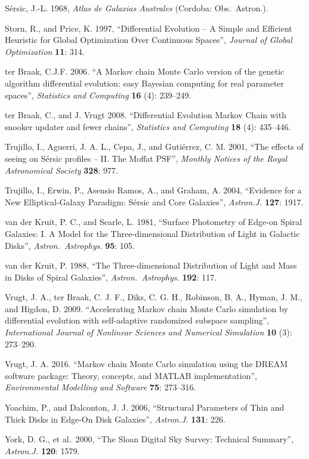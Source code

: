 \documentclass[10pt,a4paper,article]{memoir}
\begin{document}
\begin{thebibliography}{}
 S{\'e}rsic, J.-L. 1968, \textit{Atlas de 
Galaxias Australes} (Cordoba: Obs.\ Astron.).

 Storn, R., and Price, K. 1997, ``Differential
Evolution -- A Simple and Efficient Heuristic for Global Optimization Over
Continuous Spaces'', \textit{Journal of Global Optimization} \textbf{11}: 314.

 ter Braak, C.J.F. 2006.
``A Markov chain Monte Carlo version of the genetic
algorithm differential evolution: easy Bayesian computing for real
parameter spaces'', \textit{Statistics and Computing} \textbf{16} (4): 239--249.

 ter Braak, C., and J.
Vrugt 2008. ``Differential Evolution Markov Chain with snooker updater
and fewer chains'', \textit{Statistics and Computing} \textbf{18} (4): 435--446.

 Trujillo, I., Aguerri, J. A. L.,
Cepa, J., and Guti{\'e}rrez, C. M. 2001, ``The effects of seeing on S{\'e}rsic
profiles -- II. The Moffat PSF'', \textit{Monthly Notices of the Royal
Astronomical Society} \textbf{328}: 977.

 Trujillo, I., Erwin, P., Asensio
Ramos, A., and Graham, A. 2004, ``Evidence for a New Elliptical-Galaxy Paradigm:
S{\'e}rsic and Core Galaxies'', \textit{Astron.J.} \textbf{127}: 1917.

 van der Kruit, P. C., and
Searle, L. 1981, ``Surface Photometry of Edge-on Spiral Galaxies: I. A
Model for the Three-dimensional Distribution of Light in Galactic
Disks'', \textit{Astron.\ Astrophys.} \textbf{95}: 105.

 van der Kruit, P. 1988, ``The
Three-dimensional Distribution of Light and Mass in Disks of Spiral
Galaxies'', \textit{Astron.\ Astrophys.} \textbf{192}: 117.

 Vrugt, J. A., ter Braak, C. J. F.,
Diks, C. G. H., Robinson, B. A., Hyman, J. M., and Higdon, D. 2009.
``Accelerating Markov chain Monte Carlo simulation by differential
evolution with self-adaptive randomized subspace sampling'',
\textit{International Journal of Nonlinear Sciences and Numerical
Simulation} \textbf{10} (3): 273--290.

 Vrugt, J. A. 2016. ``Markov chain Monte
Carlo simulation using the DREAM software package: Theory, concepts, and
MATLAB implementation'', \textit{Environmental Modelling and Software}
\textbf{75}: 273--316.

 Yoachim, P., and Dalconton, J. J.
2006, ``Structural Parameters of Thin and Thick Disks in Edge-On Disk
Galaxies'', \textit{Astron.J.} \textbf{131}: 226.

 York, D. G., et al.\ 2000, ``The Sloan Digital 
Sky Survey: Technical Summary'', \textit{Astron.J.} \textbf{120}: 1579.


\end{thebibliography}
%
\end{document}
